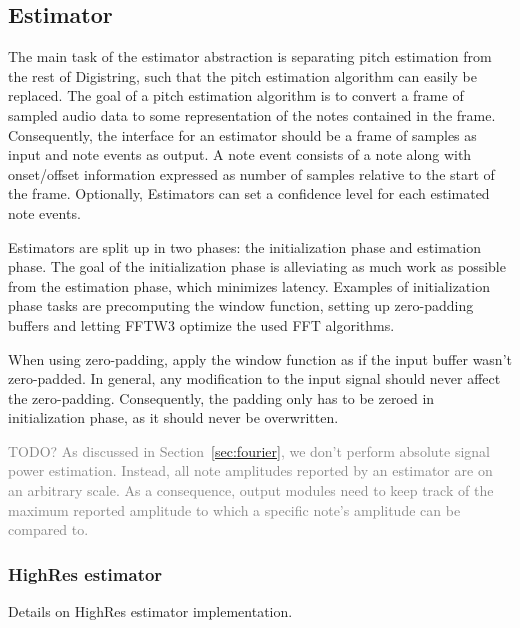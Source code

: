 \documentclass[a4paper,10pt,twocolumn]{article}
\begin{document}
\subsection{Estimator}
%
The main task of the estimator abstraction is separating pitch estimation from the rest of Digistring, such that the pitch estimation algorithm can easily be replaced. The goal of a pitch estimation algorithm is to convert a frame of sampled audio data to some representation of the notes contained in the frame. Consequently, the interface for an estimator should be a frame of samples as input and note events as output. A note event consists of a note along with onset/offset information expressed as number of samples relative to the start of the frame. Optionally, Estimators can set a confidence level for each estimated note events.

Estimators are split up in two phases: the initialization phase and estimation phase. The goal of the initialization phase is alleviating as much work as possible from the estimation phase, which minimizes latency. Examples of initialization phase tasks are precomputing the window function, setting up zero-padding buffers and letting FFTW3 optimize the used FFT algorithms.

When using zero-padding, apply the window function as if the input buffer wasn't zero-padded. In general, any modification to the input signal should never affect the zero-padding. Consequently, the padding only has to be zeroed in initialization phase, as it should never be overwritten.

\textcolor{gray}{TODO? As discussed in Section~\ref{sec:fourier}, we don't perform absolute signal power estimation. Instead, all note amplitudes reported by an estimator are on an arbitrary scale. As a consequence, output modules need to keep track of the maximum reported amplitude to which a specific note's amplitude can be compared to.}

\subsubsection{HighRes estimator}
Details on HighRes estimator implementation.
\end{document}
